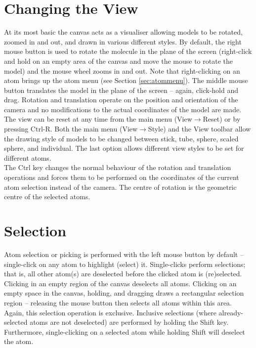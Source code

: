 \section{Changing the View}
At its most basic the canvas acts as a visualiser allowing models to be rotated, zoomed in and out, and drawn in various different styles. By default, the right mouse button is used to rotate the molecule in the plane of the screen (right-click and hold on an empty area of the canvas and move the mouse to rotate the model) and the mouse wheel zooms in and out. Note that right-clicking on an atom brings up the atom menu (see Section \ref{sec:atommenu}). The middle mouse button translates the model in the plane of the screen -- again, click-hold and drag. Rotation and translation operate on the position and orientation of the camera and no modifications to the actual coordinates of the model are made. The view can be reset at any time from the main menu (View$\rightarrow$Reset) or by pressing Ctrl-R. Both the main menu (View$\rightarrow$Style) and the View toolbar allow the drawing style of models to be changed between stick, tube, sphere, scaled sphere, and individual. The last option allows different view styles to be set for different atoms.\\

The Ctrl key changes the normal behaviour of the rotation and translation operations and forces them to be performed on the coordinates of the current atom selection instead of the camera. The centre of rotation is the geometric centre of the selected atoms.

\section{Selection}
Atom selection or picking is performed with the left mouse button by default -- single-click on any atom to highlight (select) it. Single-clicks perform  selections; that is, all other atom(s) are deselected before the clicked atom is (re)selected. Clicking in an empty region of the canvas deselects all atoms. Clicking on an empty space in the canvas, holding, and dragging draws a rectangular selection region -- releasing the mouse button then selects all atoms within this area. Again, this selection operation is exclusive. Inclusive selections (where already-selected atoms are not deselected) are performed by holding the Shift key. Furthermore, single-clicking on a selected atom while holding Shift will deselect the atom.\\


